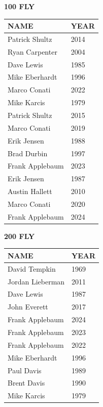 \begin{table}[H]
\centering
\begin{minipage}[t]{0.48\textwidth}
\centering
\textbf{100 FLY}\\[0.1cm]
\begin{tabular}{@{}p{2.8cm}p{1.2cm}@{}}
\hline
    \textbf{NAME} & \textbf{YEAR} \\
\hline
    Patrick Shultz & 2014 \\
    Ryan Carpenter & 2004 \\
    Dave Lewis & 1985 \\
    Mike Eberhardt & 1996 \\
    Marco Conati & 2022 \\
    Mike Karcis & 1979 \\
    Patrick Shultz & 2015 \\
    Marco Conati & 2019 \\
    Erik Jensen & 1988 \\
    Brad Durbin & 1997 \\
    Frank Applebaum & 2023 \\
    Erik Jensen & 1987 \\
    Austin Hallett & 2010 \\
    Marco Conati & 2020 \\
    Frank Applebaum & 2024 \\
\hline
\end{tabular}
\end{minipage}\hfill
\begin{minipage}[t]{0.48\textwidth}
\centering
\textbf{200 FLY}\\[0.1cm]
\begin{tabular}{@{}p{2.8cm}p{1.2cm}@{}}
\hline
    \textbf{NAME} & \textbf{YEAR} \\
\hline
    David Tempkin & 1969 \\
    Jordan Lieberman & 2011 \\
    Dave Lewis & 1987 \\
    John Everett & 2017 \\
    Frank Applebaum & 2024 \\
    Frank Applebaum & 2023 \\
    Frank Applebaum & 2022 \\
    Mike Eberhardt & 1996 \\
    Paul Davis & 1989 \\
    Brent Davis & 1990 \\
    Mike Karcis & 1979 \\
\hline
\end{tabular}
\end{minipage}
\end{table}

